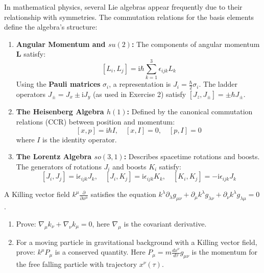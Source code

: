 \begin{example}
In mathematical physics, several Lie algebras appear frequently due to their relationship with symmetries. The commutation relations for the basis elements define the algebra's structure:

\begin{enumerate}
    \item \textbf{Angular Momentum and $su(2)$:}
    The components of angular momentum $\mathbf{L}$ satisfy:
    \[ [L_i, L_j] = \mathrm{i} \hbar \sum_{k=1}^3 \epsilon_{ijk} L_k \]
    Using the \textbf{Pauli matrices} $\sigma_i$, a representation is $J_i = \frac{\hbar}{2}\sigma_i$. The ladder operators $J_\pm = J_x \pm \mathrm{i}J_y$ (as used in Exercise 2) satisfy $[J_z, J_\pm] = \pm \hbar J_\pm$.
    
    \item \textbf{The Heisenberg Algebra $h(1)$:}
    Defined by the canonical commutation relations (CCR) between position and momentum:
    \[ [x, p] = \mathrm{i} \hbar I, \quad [x, I] = 0, \quad [p, I] = 0 \]
    where $I$ is the identity operator.
    
    \item \textbf{The Lorentz Algebra $so(3,1)$:}
    Describes spacetime rotations and boosts. The generators of rotations $J_i$ and boosts $K_i$ satisfy:
    \[ [J_i, J_j] = \mathrm{i} \epsilon_{ijk} J_k, \quad [J_i, K_j] = \mathrm{i} \epsilon_{ijk} K_k, \quad [K_i, K_j] = -\mathrm{i} \epsilon_{ijk} J_k \]
\end{enumerate}
\end{example}

\begin{exercise}
\label{physics:2022:3}
A Killing vector field $k^\mu \frac{\partial}{\partial x^\mu}$ satisfies the equation $k^\lambda \partial_\lambda g_{\mu\nu} + \partial_\mu k^\lambda g_{\lambda\nu} + \partial_\nu k^\lambda g_{\lambda\mu} = 0$.

\begin{enumerate}[label=(\alph*)]
    \item Prove: $\nabla_\mu k_\nu + \nabla_\nu k_\mu = 0$, here $\nabla_\mu$ is the covariant derivative.
    \item For a moving particle in gravitational background with a Killing vector field, prove: $k^\mu P_\mu$ is a conserved quantity. Here $P_\mu = m \frac{dx^\nu}{d\tau}g_{\mu\nu}$ is the momentum for the free falling particle with trajectory $x^\nu(\tau)$.
\end{enumerate}
\end{exercise}

